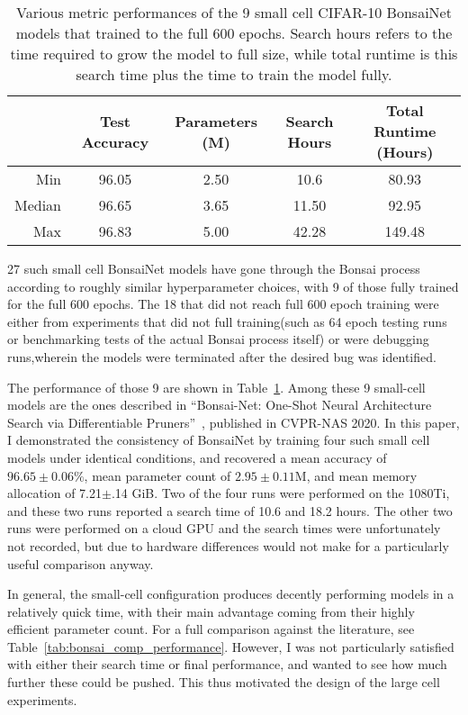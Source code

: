 \begin{table}[h]
\begin{center}
	\begin{tabular}{r|c|c|c|c}
	 & Test Accuracy & Parameters (M) & Search Hours & Total Runtime (Hours)\\
	\hline
	Min    & 96.05 & 2.50 & 10.6  & 80.93\\
	Median & 96.65 & 3.65 & 11.50 & 92.95\\
	Max    & 96.83 & 5.00 & 42.28 & 149.48\\
	\end{tabular}
\end{center}
\caption{Various metric performances of the 9 small cell CIFAR-10 BonsaiNet models that trained to the full 600 epochs.
Search hours refers to the time required to grow the model to full size, while total runtime is this search time plus
the time to train the model fully.}
\label{tab:small_cell_metrics}
\end{table}
27 such small cell BonsaiNet models have gone through the Bonsai process according to roughly similar hyperparameter choices,
with 9 of those fully trained for the full 600 epochs. The 18 that did not reach full 600 epoch training were either
from experiments that did not full training(such as 64 epoch testing runs or benchmarking tests of the actual Bonsai process itself)
or were debugging runs,wherein the models were terminated after the desired bug was identified.

The performance of those 9 are shown in Table~\ref{tab:small_cell_metrics}. Among these 9
small-cell models are the ones described in ``Bonsai-Net: One-Shot Neural Architecture Search via
Differentiable Pruners''~\cite{geada2020}, published
in CVPR-NAS 2020. In this paper, I demonstrated the consistency of BonsaiNet by training four such small cell
models under identical conditions, and recovered a mean accuracy of $96.65\pm0.06\%$, mean parameter count of
$2.95\pm0.11$M, and mean memory allocation of 7.21$\pm$.14 GiB.
Two of the four runs were performed on the 1080Ti, and these two runs reported a search time of 10.6
and 18.2 hours. The other two runs were performed on a cloud GPU and the search times were unfortunately not recorded, but
due to hardware differences would not make for a particularly useful comparison anyway.

In general, the small-cell configuration produces decently performing models in a relatively quick time, with their main
advantage coming from their highly efficient parameter count. For a full comparison against the literature, see
Table~\ref{tab:bonsai_comp_performance}. However, I was not particularly satisfied with either
their search time or final performance, and wanted to see how much further these could be pushed. This thus motivated
the design of the large cell experiments.

